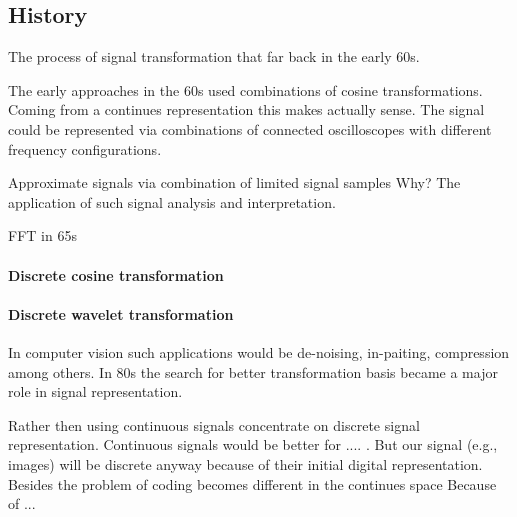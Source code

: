 \subsection{History}
\label{sec:history}
The process of signal transformation that far back in the early 60s.\cite{Rubinstein2010}

The early approaches in the 60s used combinations of cosine transformations. Coming from a continues representation this makes 
actually sense. The signal could be represented via combinations of connected oscilloscopes with different frequency configurations. 

Approximate signals via combination of limited signal samples
Why?
The application of such signal analysis and interpretation.


FFT in 65s



\paragraph{Discrete cosine transformation}
\Todo{}

\paragraph{Discrete wavelet transformation}
\Todo{}

In computer vision such applications would be de-noising, in-paiting, compression among others.
In 80s the search for better transformation basis became a major role in signal representation. \cite{}

Rather then using continuous signals concentrate on discrete signal representation.
Continuous signals would be better for .... . 
But our signal (e.g., images) will be discrete anyway because of their initial digital representation. 
Besides the problem of coding becomes different in the continues space \cite{} Because of ...

